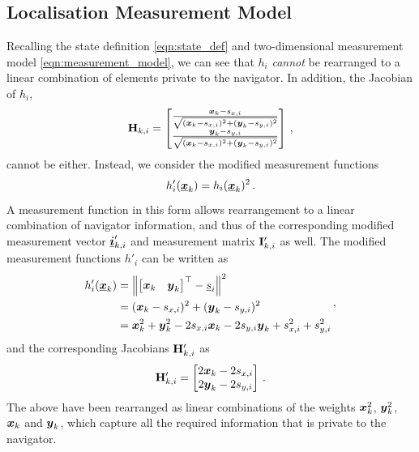 \documentclass[twocolumn]{autart}
\begin{document}
\subsection{Localisation Measurement Model} \label{subsec:observation_model}
Recalling the state definition \eqref{eqn:state_def} and two-dimensional measurement model \eqref{eqn:measurement_model}, we can see that $h_i$ \textit{cannot} be rearranged to a linear combination of elements private to the navigator. In addition, the Jacobian of $h_i$,
\begin{equation}
    {\ensuremath{{\mathbf{H}}}}_{k,i} = 
    \begin{bmatrix}
        \frac{{\boldsymbol{x}}_k - s_{x,i}}{\sqrt{({\boldsymbol{x}}_k - s_{x,i})^2 + ({\boldsymbol{y}}_k - s_{y,i})^2}} \\
        \frac{{\boldsymbol{y}}_k - s_{y,i}}{\sqrt{({\boldsymbol{x}}_k - s_{x,i})^2 + ({\boldsymbol{y}}_k - s_{y,i})^2}} 
    \end{bmatrix}\,,
\end{equation}
cannot be either. Instead, we consider the modified measurement functions
\begin{equation}
    h'_i({\boldsymbol{\underline{x}}}_k) = h_i({\boldsymbol{\underline{x}}}_k)^2\,. \label{eqn:modified_measurement_func}
\end{equation}
A measurement function in this form allows rearrangement to a linear combination of navigator information, and thus of the corresponding modified measurement vector ${\boldsymbol{\underline{i}}}'_{k,i}$ and measurement matrix ${{\mathbf{I}}}'_{k,i}$ as well. The modified measurement functions $h'_i$ can be written as
\begin{equation}
    \begin{split}
        h'_i({\boldsymbol{\underline{x}}}_k) &= \left\lVert
        \begin{bmatrix}
            {\boldsymbol{x}}_k & {\boldsymbol{y}}_k
        \end{bmatrix}^\top - {\underline{s}}_i\right\rVert^2 \\
        &= ({\boldsymbol{x}}_k - s_{x,i})^2 + ({\boldsymbol{y}}_k - s_{y,i})^2 \\
        &= {\boldsymbol{x}}_k^2 + {\boldsymbol{y}}_k^2 -2s_{x,i}{\boldsymbol{x}}_k -2s_{y,i}{\boldsymbol{y}}_k +s_{x,i}^2 +s_{y,i}^2
    \end{split}\,,
\end{equation}
and the corresponding Jacobians ${{\mathbf{H}}}'_{k,i}$ as
\begin{equation}
    {\ensuremath{{\mathbf{H}}}}'_{k,i} = 
    \begin{bmatrix}
        2{\boldsymbol{x}}_k - 2s_{x,i} \\
        2{\boldsymbol{y}}_k - 2s_{y,i}
    \end{bmatrix}\,.
\end{equation}
The above have been rearranged as linear combinations of the weights ${\boldsymbol{x}}_k^2$, ${\boldsymbol{y}}_k^2$, ${\boldsymbol{x}}_k$ and ${\boldsymbol{y}}_k$, which capture all the required information that is private to the navigator. 
\end{document}
